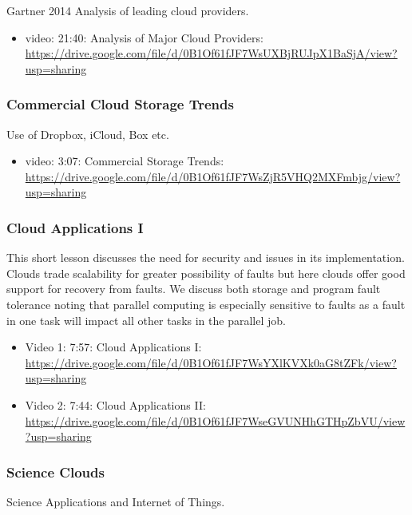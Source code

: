 Gartner 2014 Analysis of leading cloud providers.

\begin{itemize}
\tightlist
\item
  video: 21:40: Analysis of Major Cloud Providers:
  \url{https://drive.google.com/file/d/0B1Of61fJF7WsUXBjRUJpX1BaSjA/view?usp=sharing}
\end{itemize}

\subsubsection{Commercial Cloud Storage
Trends}\label{commercial-cloud-storage-trends}

Use of Dropbox, iCloud, Box etc.

\begin{itemize}
\tightlist
\item
  video: 3:07: Commercial Storage Trends:
  \url{https://drive.google.com/file/d/0B1Of61fJF7WsZjR5VHQ2MXFmbjg/view?usp=sharing}
\end{itemize}

\subsubsection{Cloud Applications I}\label{cloud-applications-i}

This short lesson discusses the need for security and issues in its
implementation. Clouds trade scalability for greater possibility of
faults but here clouds offer good support for recovery from faults. We
discuss both storage and program fault tolerance noting that parallel
computing is especially sensitive to faults as a fault in one task will
impact all other tasks in the parallel job.

\begin{itemize}
\tightlist
\item
  Video 1: 7:57: Cloud Applications I:
  \url{https://drive.google.com/file/d/0B1Of61fJF7WsYXlKVXk0aG8tZFk/view?usp=sharing}
\item
  Video 2: 7:44: Cloud Applications II:
  \url{https://drive.google.com/file/d/0B1Of61fJF7WseGVUNHhGTHpZbVU/view?usp=sharing}
\end{itemize}

\subsubsection{Science Clouds}\label{science-clouds}

Science Applications and Internet of Things.

